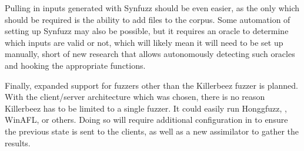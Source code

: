 Pulling in inputs generated with Synfuzz should be even easier, as the only
\REST{} \API{} which should be required is the ability to add files to the corpus.
Some automation of setting up Synfuzz may also be possible, but it requires an
oracle to determine which inputs are valid or not, which will likely mean it
will need to be set up manually, short of new research that allows
autonomously detecting such oracles and hooking the appropriate functions.

Finally, expanded support for fuzzers other than the Killerbeez fuzzer is planned. With
the client/server architecture which was chosen, there is no reason Killerbeez
has to be limited to a single fuzzer.  It could easily run Honggfuzz,
\AFL{}, WinAFL, or others.  Doing so will require additional configuration in
\BOINC{} to ensure the previous state is sent to the \BOINC{} clients, as well
as a new \BOINC{} assimilator to gather the results.







